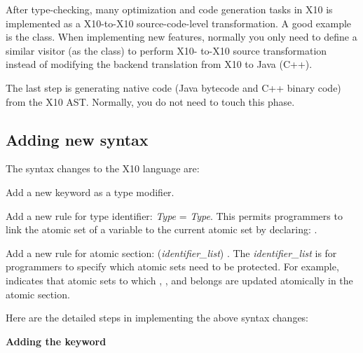 \documentclass{article}
\begin{document}
\begin{enumerate}
\Item After type-checking, many optimization and code generation tasks in X10 is implemented as a X10-to-X10 source-code-level transformation. A good example is the  class. When implementing new features, normally you only need to define a similar visitor (as the  class) to perform X10- to-X10 source transformation instead of modifying the backend translation from X10 to Java (C++).

\Item The last step is generating native code (Java bytecode and C++ binary code) from the X10 AST. Normally, you do not need to touch this phase.


\end{enumerate}

\subsection{Adding new syntax}
\label{sec:keyword}

The syntax changes to the X10 language are:

\begin{itemize}

\Item Add a new keyword  as a type modifier.

\Item Add a new rule for type identifier:  \textit{Type} =  \textit{Type}. This permits programmers to link the atomic set of a variable to the current  atomic set by declaring: .

\Item Add a new rule for atomic section: (\textit{identifier\_list})  . The \textit{identifier\_list} is  for programmers to specify which atomic sets need to be protected. For example,  indicates that atomic sets to which , , and  belongs are updated atomically in the atomic section.

\end{itemize}

Here are the detailed steps in implementing the above syntax changes:

\textbf{Adding the  keyword}
\end{document}
